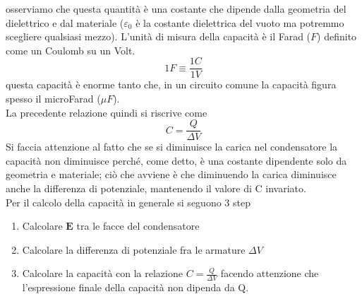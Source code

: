 \documentclass[10pt,a4paper]{article}
\begin{document}
osserviamo che questa quantità è una costante che dipende dalla geometria del dielettrico e dal materiale ($\varepsilon_0$ è la costante dielettrica del vuoto ma potremmo scegliere qualsiasi mezzo). L'unità di misura della capacità è il Farad (\(F\)) definito come un Coulomb su un Volt. 
\[1F \equiv \frac{1C}{1V}\]
questa capacità è enorme tanto che, in un circuito comune la capacità figura spesso il microFarad (\(\mu F\)).\\
La precedente relazione quindi si riscrive come
\[C = \frac{Q}{\Delta V}\]
Si faccia attenzione al fatto che se si diminuisce la carica nel condensatore la capacità non diminuisce perché, come detto, è una costante dipendente solo da geometria e materiale; ciò che avviene è che diminuendo la carica diminuisce anche la differenza di potenziale, mantenendo il valore di C invariato.\\
Per il calcolo della capacità in generale si seguono 3 step
\begin{enumerate}
\item Calcolare $\mathbf{E}$ tra le facce del condensatore
\item Calcolare la differenza di potenziale fra le armature \(\Delta V\)
\item Calcolare la capacità con la relazione \(C=\frac{Q}{\Delta V}\) facendo attenzione che l'espressione finale della capacità non dipenda da Q. 
\end{enumerate} 
\end{document}
